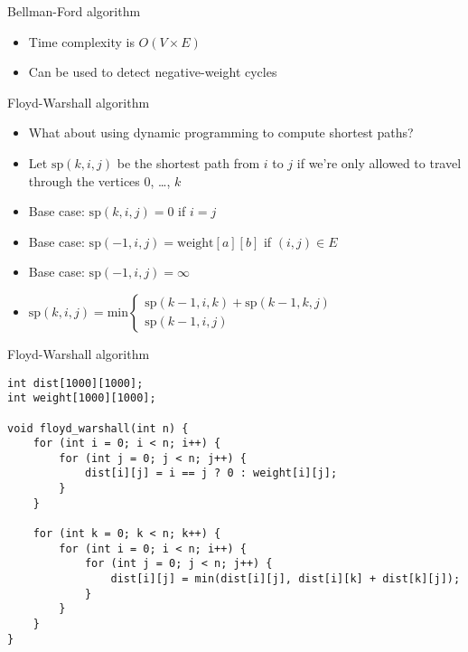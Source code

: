 \documentclass[10pt]{beamer}
\newcommand{\bi}{\begin{itemize}}
\newcommand{\ei}{\end{itemize}}
\begin{document}
\begin{frame}{Bellman-Ford algorithm}
    \bi
        \item Time complexity is $O(V\times E)$
        \vspace{10pt}
        \item Can be used to detect negative-weight cycles
    \ei
\end{frame}

\begin{frame}{Floyd-Warshall algorithm}
    \bi
        \item What about using dynamic programming to compute shortest paths?
        \vspace{10pt}
    \item Let $\mathrm{sp}(k, i, j)$ be the shortest path from $i$ to $j$ if we're only allowed to travel through the vertices $0$, \ldots, $k$
        \vspace{5pt}
    \item Base case: $\mathrm{sp}(k, i, j) = 0$ if $i = j$
    \item Base case: $\mathrm{sp}(-1, i, j) = \mathrm{weight}[a][b]$ if $(i,j) \in E$
    \item Base case: $\mathrm{sp}(-1, i, j) = \infty$
        \vspace{5pt}
    \item $\mathrm{sp}(k, i, j) = \mathrm{min} \left\{
	\begin{array}{l}
        \mathrm{sp}(k - 1, i, k) + \mathrm{sp}(k - 1, k, j) \\
        \mathrm{sp}(k - 1, i, j)
	\end{array}
\right.$
    \ei
\end{frame}

\begin{frame}[fragile]{Floyd-Warshall algorithm}
    \begin{verbatim}
int dist[1000][1000];
int weight[1000][1000];

void floyd_warshall(int n) {
    for (int i = 0; i < n; i++) {
        for (int j = 0; j < n; j++) {
            dist[i][j] = i == j ? 0 : weight[i][j];
        }
    }

    for (int k = 0; k < n; k++) {
        for (int i = 0; i < n; i++) {
            for (int j = 0; j < n; j++) {
                dist[i][j] = min(dist[i][j], dist[i][k] + dist[k][j]);
            }
        }
    }
}
    \end{verbatim}
\end{frame}
\end{document}
